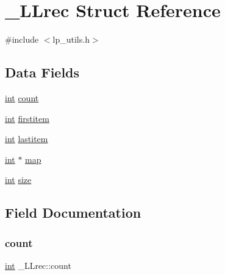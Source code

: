 \hypertarget{struct___l_lrec}{}\section{\+\_\+\+L\+Lrec Struct Reference}
\label{struct___l_lrec}


{\ttfamily \#include $<$lp\+\_\+utils.\+h$>$}

\subsection*{Data Fields}
\begin{DoxyCompactItemize}
\item 
\hyperlink{lp__lib_8h_adeb9ec6400320e4923ac9d836d509ddb}{int} \hyperlink{struct___l_lrec_a10fe9398d9f974bba44f3b7c845ed322}{count}
\item 
\hyperlink{lp__lib_8h_adeb9ec6400320e4923ac9d836d509ddb}{int} \hyperlink{struct___l_lrec_aed64c514edf3c317aaa483a0908a69d2}{firstitem}
\item 
\hyperlink{lp__lib_8h_adeb9ec6400320e4923ac9d836d509ddb}{int} \hyperlink{struct___l_lrec_ab2476e123c4d774036cef2b87edcf56c}{lastitem}
\item 
\hyperlink{lp__lib_8h_adeb9ec6400320e4923ac9d836d509ddb}{int} $\ast$ \hyperlink{struct___l_lrec_a11b275996a8e25f73afb7178316cdaf5}{map}
\item 
\hyperlink{lp__lib_8h_adeb9ec6400320e4923ac9d836d509ddb}{int} \hyperlink{struct___l_lrec_a9dc2c36f700e9b662562b26a8d941a76}{size}
\end{DoxyCompactItemize}


\subsection{Field Documentation}
\mbox{\label{struct___l_lrec_a10fe9398d9f974bba44f3b7c845ed322}} 
\subsubsection{\texorpdfstring{count}{count}}
{\footnotesize\ttfamily \hyperlink{lp__lib_8h_adeb9ec6400320e4923ac9d836d509ddb}{int} \+\_\+\+L\+Lrec\+::count}

\mbox{\label{struct___l_lrec_aed64c514edf3c317aaa483a0908a69d2}} 
